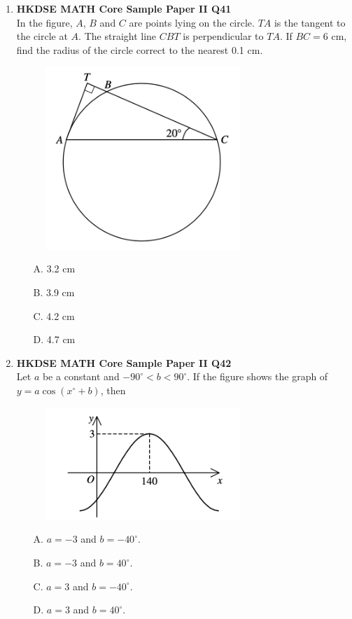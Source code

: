 \documentclass[12pt]{article}
\begin{document}
\begin{enumerate}
	\item \textbf{HKDSE MATH Core Sample Paper II Q41}\\
	In the figure, $A$, $B$ and $C$ are points lying on the circle. $TA$ is the tangent to the circle at $A$. The straight line $CBT$ is perpendicular to $TA$. If $BC = 6$ cm, find the radius of the circle correct to the nearest 0.1 cm.
	\begin{figure}[H]
		\centering
		\includegraphics[width = 0.7\textwidth]{SPFigure2.41.png}	
	\end{figure}
	\begin{enumerate}
		\item[A.] 3.2 cm
		\item[B.] 3.9 cm
		\item[C.] 4.2 cm
		\item[D.] 4.7 cm
	\end{enumerate}
	
	\item \textbf{HKDSE MATH Core Sample Paper II Q42}\\
	Let $a$ be a constant and $-90^\circ < b < 90^\circ$. If the figure shows the graph of $y = a\cos{(x^\circ + b)}$, then 
	\begin{figure}[H]
		\centering
		\includegraphics[width = 0.7\textwidth]{SPFigure2.42.png}	
	\end{figure}
	\begin{enumerate}
		\item[A.] $a = -3$ and $b = -40^\circ$.
		\item[B.] $a = -3$ and $b = 40^\circ$.
		\item[C.] $a = 3$ and $b = -40^\circ$.
		\item[D.] $a = 3$ and $b = 40^\circ$.
	\end{enumerate}
	

\end{enumerate}
\end{document}
